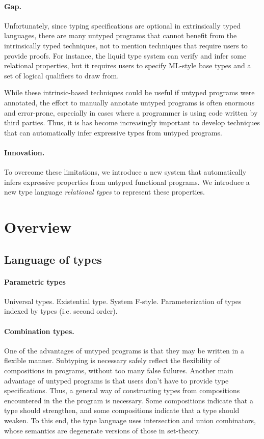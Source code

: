 \documentclass[acmsmall]{acmart}
\begin{document}
\paragraph{Gap.} 
Unfortunately, since typing specifications are optional in extrinsically typed languages,
there are many untyped programs that cannot benefit from the intrinsically typed techniques,
not to mention techniques that require users to provide proofs.
For instance, the liquid type system \cite{} can verify and infer some relational properties, 
but it requires users to specify ML-style base types and a set of logical qualifiers to draw from.

While these intrinsic-based techniques could be useful if untyped programs were annotated,
the effort to manually annotate untyped programs is often enormous and error-prone, 
especially in cases where a programmer is using code written by third parties.
Thus, it is has become increasingly important to develop techniques 
that can automatically infer expressive types from untyped programs.

\paragraph{Innovation.} 
To overcome these limitations, we introduce a new system 
that automatically infers expressive properties from untyped functional programs. 
We introduce a new type language \textit{relational types} to represent these properties.




\section{Overview}

\subsection{Language of types}

\paragraph{Parametric types}
Universal types. Existential type. System F-style. Parameterization of types indexed by types (i.e. second order).

\paragraph{Combination types.}
One of the advantages of untyped programs is that they may be written in a flexible manner.
Subtyping is necessary safely reflect the flexibility of compositions in programs, without too many false failures.
Another main advantage of untyped programs is that users don't have to provide type specifications.
Thus, a general way of constructing types from compositions encountered in the the program is necessary.
Some compositions indicate that a type should strengthen, and some compositions indicate that a type should weaken.
To this end, the type language uses intersection and union combinators, 
whose semantics are degenerate versions of those in set-theory.
\end{document}
